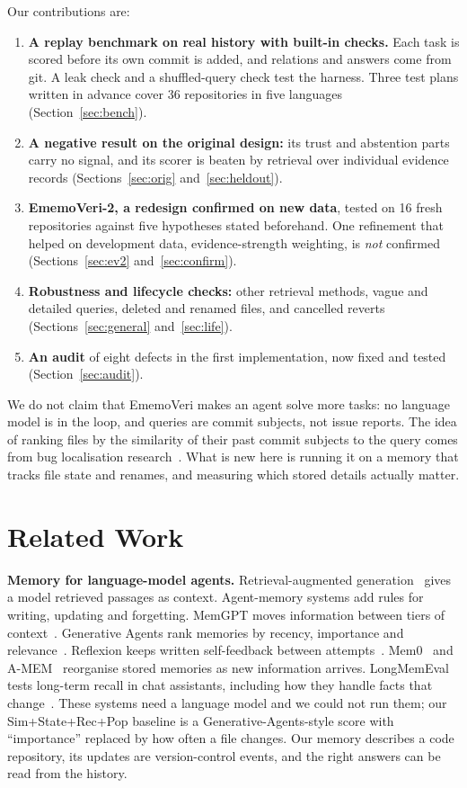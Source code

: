 \documentclass[runningheads]{llncs}
\newcommand{\sys}{EmemoVeri}
\begin{document}
\noindent Our contributions are:
\begin{enumerate}
\item \textbf{A replay benchmark on real history with built-in checks.} Each task is scored before its own commit is added, and relations and answers come from git. A leak check and a shuffled-query check test the harness. Three test plans written in advance cover 36 repositories in five languages (Section~\ref{sec:bench}).
\item \textbf{A negative result on the original design:} its trust and abstention parts carry no signal, and its scorer is beaten by retrieval over individual evidence records (Sections~\ref{sec:orig} and~\ref{sec:heldout}).
\item \textbf{\sys{}-2, a redesign confirmed on new data}, tested on 16 fresh repositories against five hypotheses stated beforehand. One refinement that helped on development data, evidence-strength weighting, is \emph{not} confirmed (Sections~\ref{sec:ev2} and~\ref{sec:confirm}).
\item \textbf{Robustness and lifecycle checks:} other retrieval methods, vague and detailed queries, deleted and renamed files, and cancelled reverts (Sections~\ref{sec:general} and~\ref{sec:life}).
\item \textbf{An audit} of eight defects in the first implementation, now fixed and tested (Section~\ref{sec:audit}).
\end{enumerate}
We do not claim that \sys{} makes an agent solve more tasks: no language model is in the loop, and queries are commit subjects, not issue reports. The idea of ranking files by the similarity of their past commit subjects to the query comes from bug localisation research~\cite{zhou2012buglocator}. What is new here is running it on a memory that tracks file state and renames, and measuring which stored details actually matter.

\section{Related Work}
\textbf{Memory for language-model agents.} Retrieval-augmented generation~\cite{lewis2020rag} gives a model retrieved passages as context. Agent-memory systems add rules for writing, updating and forgetting. MemGPT moves information between tiers of context~\cite{packer2023memgpt}. Generative Agents rank memories by recency, importance and relevance~\cite{park2023generative}. Reflexion keeps written self-feedback between attempts~\cite{shinn2023reflexion}. Mem0~\cite{chhikara2025mem0} and A-MEM~\cite{xu2025amem} reorganise stored memories as new information arrives. LongMemEval tests long-term recall in chat assistants, including how they handle facts that change~\cite{wu2024longmemeval}. These systems need a language model and we could not run them; our Sim+State+Rec+Pop baseline is a Generative-Agents-style score with ``importance'' replaced by how often a file changes. Our memory describes a code repository, its updates are version-control events, and the right answers can be read from the history.
\end{document}
